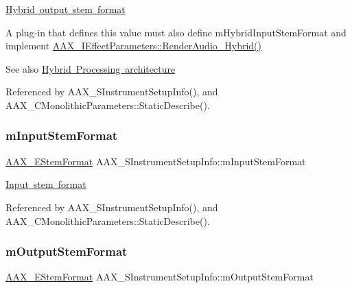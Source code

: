 \mbox{\hyperlink{a00805_ga13e384f22825afd3db6d68395b79ce0dac30a4e73772e37267dfef39ae3122705}{Hybrid output stem format}} 

A plug-\/in that defines this value must also define {\ttfamily m\+Hybrid\+Input\+Stem\+Format} and implement \mbox{\hyperlink{a00805_gae6139041de22f51f3146d26a01c54c1b}{A\+A\+X\+\_\+\+I\+Effect\+Parameters\+::\+Render\+Audio\+\_\+\+Hybrid()}} \begin{DoxySeeAlso}{See also}
\mbox{\hyperlink{a00805}{Hybrid Processing architecture}} 
\end{DoxySeeAlso}


Referenced by A\+A\+X\+\_\+\+S\+Instrument\+Setup\+Info(), and A\+A\+X\+\_\+\+C\+Monolithic\+Parameters\+::\+Static\+Describe().

\mbox{\label{a01957_aeb7ea647e496b742bc5bad5576f5ec1f}} 
\subsubsection{\texorpdfstring{mInputStemFormat}{mInputStemFormat}}
{\footnotesize\ttfamily \mbox{\hyperlink{a00491_ad8af5ef008b2bd478add9a0acb0a1d85}{A\+A\+X\+\_\+\+E\+Stem\+Format}} A\+A\+X\+\_\+\+S\+Instrument\+Setup\+Info\+::m\+Input\+Stem\+Format}



\mbox{\hyperlink{a00662_a13e384f22825afd3db6d68395b79ce0dadebf03028b758123965a8b988fa2df99}{Input stem format}} 



Referenced by A\+A\+X\+\_\+\+S\+Instrument\+Setup\+Info(), and A\+A\+X\+\_\+\+C\+Monolithic\+Parameters\+::\+Static\+Describe().

\mbox{\label{a01957_ac69ab2fe88b00dfb6f22d7e2ebfa134d}} 
\subsubsection{\texorpdfstring{mOutputStemFormat}{mOutputStemFormat}}
{\footnotesize\ttfamily \mbox{\hyperlink{a00491_ad8af5ef008b2bd478add9a0acb0a1d85}{A\+A\+X\+\_\+\+E\+Stem\+Format}} A\+A\+X\+\_\+\+S\+Instrument\+Setup\+Info\+::m\+Output\+Stem\+Format}



